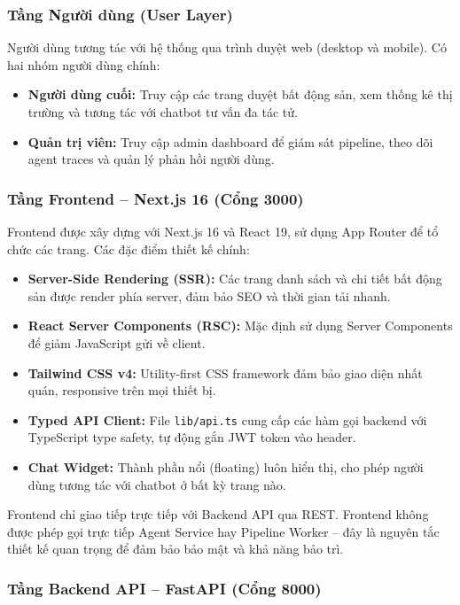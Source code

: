 \subsubsection{Tầng Người dùng (User Layer)}

Người dùng tương tác với hệ thống qua trình duyệt web (desktop và mobile). Có hai nhóm người dùng chính:
\begin{itemize}
    \item \textbf{Người dùng cuối:} Truy cập các trang duyệt bất động sản, xem thống kê thị trường và tương tác với chatbot tư vấn đa tác tử.
    \item \textbf{Quản trị viên:} Truy cập admin dashboard để giám sát pipeline, theo dõi agent traces và quản lý phản hồi người dùng.
\end{itemize}

\subsubsection{Tầng Frontend -- Next.js 16 (Cổng 3000)}

Frontend được xây dựng với Next.js 16 và React 19, sử dụng App Router để tổ chức các trang. Các đặc điểm thiết kế chính:
\begin{itemize}
    \item \textbf{Server-Side Rendering (SSR):} Các trang danh sách và chi tiết bất động sản được render phía server, đảm bảo SEO và thời gian tải nhanh.
    \item \textbf{React Server Components (RSC):} Mặc định sử dụng Server Components để giảm JavaScript gửi về client.
    \item \textbf{Tailwind CSS v4:} Utility-first CSS framework đảm bảo giao diện nhất quán, responsive trên mọi thiết bị.
    \item \textbf{Typed API Client:} File \texttt{lib/api.ts} cung cấp các hàm gọi backend với TypeScript type safety, tự động gắn JWT token vào header.
    \item \textbf{Chat Widget:} Thành phần nổi (floating) luôn hiển thị, cho phép người dùng tương tác với chatbot ở bất kỳ trang nào.
\end{itemize}

Frontend chỉ giao tiếp trực tiếp với Backend API qua REST. Frontend không được phép gọi trực tiếp Agent Service hay Pipeline Worker -- đây là nguyên tắc thiết kế quan trọng để đảm bảo bảo mật và khả năng bảo trì.

\subsubsection{Tầng Backend API -- FastAPI (Cổng 8000)}


